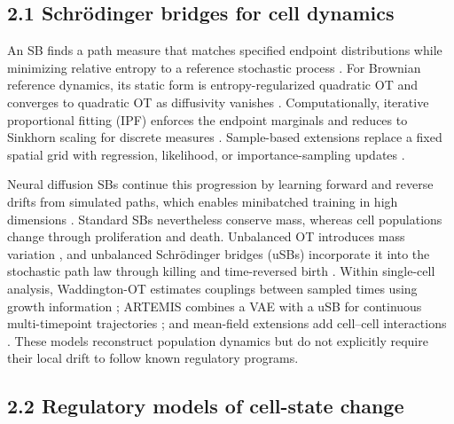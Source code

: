 \documentclass[
  11pt,
  letterpaper,
]{article}
\begin{document}
\subsection{2.1 Schrödinger bridges for cell
dynamics}\label{sbs-for-cell-dynamics}

An SB finds a path measure that matches specified endpoint distributions
while minimizing relative entropy to a reference stochastic process
\parencite{schrodinger_sur_1932,leonard_schrodinger_2012}. For Brownian reference dynamics, its
static form is entropy-regularized quadratic OT and converges to
quadratic OT as diffusivity vanishes \parencite{carlier_convergence_2017}.
Computationally, iterative proportional fitting (IPF) enforces the
endpoint marginals and reduces to Sinkhorn scaling for discrete measures
\parencite{cuturi_sinkhorn_2013}. Sample-based extensions replace a fixed spatial grid with
regression, likelihood, or importance-sampling updates
\parencite{bernton_schrodinger_2019,pavon_data-driven_2021,vargas_solving_2021}.

Neural diffusion SBs continue this progression by learning forward and
reverse drifts from simulated paths, which enables minibatched training
in high dimensions \parencite{de_bortoli_diffusion_2021,chen_likelihood_2021}.
Standard SBs nevertheless conserve mass, whereas cell populations change
through proliferation and death. Unbalanced OT introduces mass variation
\parencite{chizat_interpolating_2018,liero_optimal_2018}, and unbalanced Schrödinger
bridges (uSBs) incorporate it into the stochastic path law through
killing and time-reversed birth
\parencite{chen_most_2022,pariset_unbalanced_2023}. Within single-cell analysis,
Waddington-OT estimates couplings between sampled times using growth information
\parencite{schiebinger_optimal-transport_2019}; ARTEMIS combines a VAE with a uSB for
continuous multi-timepoint trajectories \parencite{alatkar_artemis_2025}; and
mean-field extensions add cell--cell interactions \parencite{zhang_modeling_2025}.
These models reconstruct population dynamics but do not explicitly
require their local drift to follow known regulatory programs.

\subsection{2.2 Regulatory models of cell-state
change}\label{regulatory-models-of-cell-state-change}
\end{document}
